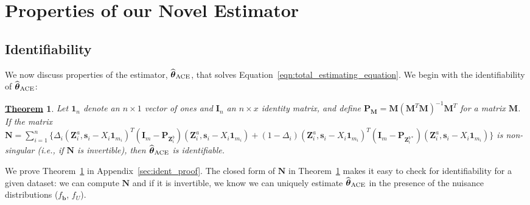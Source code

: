 \documentclass[12pt]{article}
\def\wh{\widehat}
\def\bse{\begin{eqnarray*}}
\def\ese{\end{eqnarray*}}
\def\bse{\begin{eqnarray*}}
\def\ese{\end{eqnarray*}}
\def\wh{\widehat}
\def\bx{{\mathbf x}}
\def\bX{{\mathbf X}}
\def\bS{{\mathbf S}}
\def\btheta{{\boldsymbol{\theta}}}
\def\bone{{\boldsymbol{1}}}
\def\bb{{\boldsymbol b}}
\def\bs{{\boldsymbol s}}
\def\bx{{\boldsymbol x}}
\def\bD{{\boldsymbol D}}
\def\bI{{\boldsymbol I}}
\def\bM{{\boldsymbol M}}
\def\bN{{\boldsymbol N}}
\def\bP{{\boldsymbol P}}
\def\bS{{\boldsymbol S}}
\def\bX{{\boldsymbol X}}
\def\bY{{\boldsymbol Y}}
\def\bZ{{\boldsymbol Z}}
\def\tilD{\bD}
\def\ACEest{\wh{\btheta}_{\rm ACE}}
\newtheorem{Th}{\underline{\bf Theorem}}
\begin{document}

\section{Properties of our Novel Estimator}
\label{sec:ee-properties}

\subsection{Identifiability}
\label{sec:ident}
We now discuss properties of the estimator, $\ACEest$, that solves Equation~\eqref{eqn:total_estimating_equation}. We begin with the identifiability of $\ACEest$:
\begin{Th}
\label{theorem:ident}
Let $\bone_n$ denote an $n \times 1$ vector of ones and $\bI_n$ an $n \times x$ identity matrix, and define $\bP_{\bM}=\bM(\bM^T\bM)^{-1}\bM^T$ for a matrix $\bM$. If the matrix
$\bN=\sum_{i=1}^n%
\Big\{\Delta_i (\bZ^a_i,\bs_i-X_i\bone_{m_i})^T(\bI_m - \bP_{\bZ^b_i})(\bZ^a_i,\bs_i-X_i\bone_{m_i}) + %
(1 - \Delta_i)(\bZ^a_i,\bs_i-X_i\bone_{m_i})^T(\bI_m - \bP_{\bZ^{b*}_i})(\bZ^a_i,\bs_i-X_i\bone_{m_i})\Big\}
$
is non-singular (i.e., if $\bN$ is invertible), then $\ACEest$ is identifiable.
\end{Th}
We prove Theorem~\ref{theorem:ident} in Appendix~\ref{sec:ident_proof}. The closed form of $\bN$ in Theorem~\ref{theorem:ident} makes it easy to check for identifiability for a given dataset: we can compute $\bN$ and if it is invertible, we know we can uniquely estimate $\ACEest$ in the presence of the nuisance distributions ($f_{\bb}$, $f_U$). 
\end{document}
